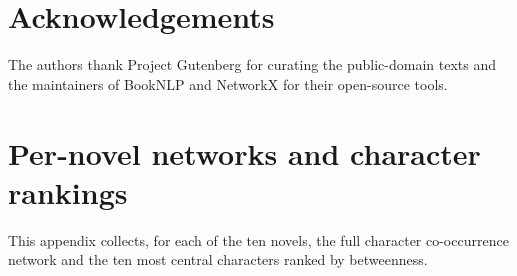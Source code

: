 \documentclass[preprint,12pt]{elsarticle}
\begin{document}
\section*{Acknowledgements}
The authors thank Project Gutenberg for curating the public-domain texts and the
maintainers of BookNLP and NetworkX for their open-source tools.




\clearpage
\appendix
\section{Per-novel networks and character rankings}
\label{app:books}
This appendix collects, for each of the ten novels, the full character
co-occurrence network and the ten most central characters ranked by betweenness.

\end{document}
